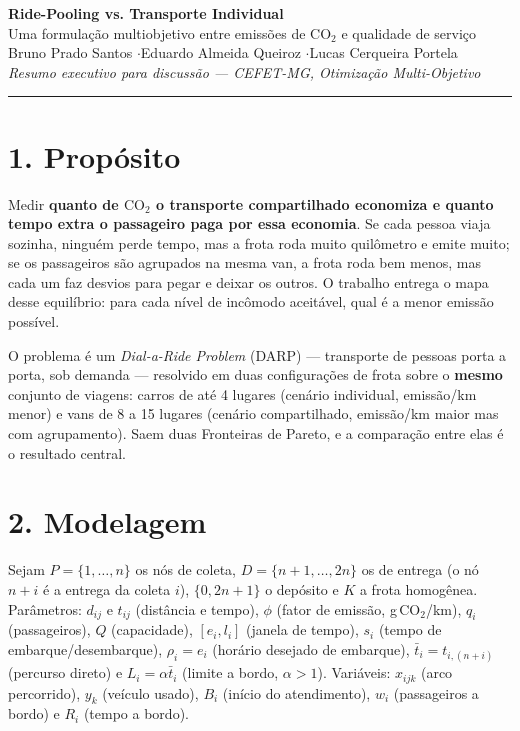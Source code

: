 \documentclass[10pt,a4paper]{article}
\theoremstyle{plain}
\begin{document}
\begin{center}
    {\large\textbf{Ride-Pooling vs. Transporte Individual}}\\[2pt]
    {\normalsize Uma formulação multiobjetivo entre emissões de $\text{CO}_2$ e qualidade de serviço}\\[4pt]
    {\small Bruno Prado Santos \quad$\cdot$\quad Eduardo Almeida Queiroz \quad$\cdot$\quad Lucas Cerqueira Portela}\\[2pt]
    {\small\textit{Resumo executivo para discussão --- CEFET-MG, Otimização Multi-Objetivo}}
\end{center}

\vspace{-2pt}
\hrule
\vspace{4pt}

\section*{1. Propósito}

Medir \textbf{quanto de $\text{CO}_2$ o transporte compartilhado economiza e quanto tempo extra o passageiro paga por essa economia}. Se cada pessoa viaja sozinha, ninguém perde tempo, mas a frota roda muito quilômetro e emite muito; se os passageiros são agrupados na mesma van, a frota roda bem menos, mas cada um faz desvios para pegar e deixar os outros. O trabalho entrega o mapa desse equilíbrio: para cada nível de incômodo aceitável, qual é a menor emissão possível.

O problema é um \textit{Dial-a-Ride Problem} (DARP) --- transporte de pessoas porta a porta, sob demanda --- resolvido em duas configurações de frota sobre o \textbf{mesmo} conjunto de viagens: carros de até 4 lugares (cenário individual, emissão/km menor) e vans de 8 a 15 lugares (cenário compartilhado, emissão/km maior mas com agrupamento). Saem duas Fronteiras de Pareto, e a comparação entre elas é o resultado central.

\section*{2. Modelagem}

Sejam $P=\{1,\dots,n\}$ os nós de coleta, $D=\{n+1,\dots,2n\}$ os de entrega (o nó $n+i$ é a entrega da coleta $i$), $\{0,2n+1\}$ o depósito e $K$ a frota homogênea. Parâmetros: $d_{ij}$ e $t_{ij}$ (distância e tempo), $\phi$ (fator de emissão, g$\,$CO$_2$/km), $q_i$ (passageiros), $Q$ (capacidade), $[e_i,l_i]$ (janela de tempo), $s_i$ (tempo de embarque/desembarque), $\rho_i=e_i$ (horário desejado de embarque), $\bar t_i = t_{i,(n+i)}$ (percurso direto) e $L_i=\alpha\bar t_i$ (limite a bordo, $\alpha>1$). Variáveis: $x_{ijk}$ (arco percorrido), $y_k$ (veículo usado), $B_i$ (início do atendimento), $w_i$ (passageiros a bordo) e $R_i$ (tempo a bordo).
\end{document}
